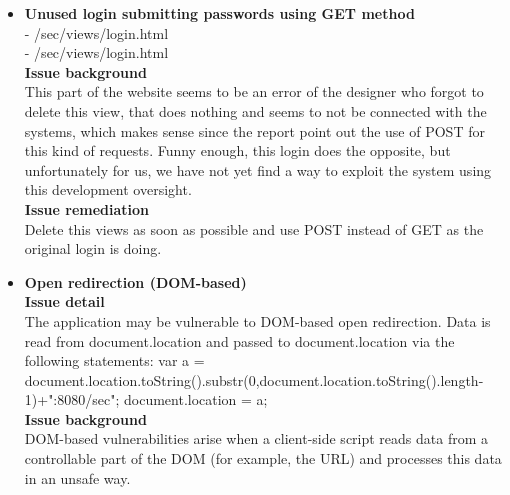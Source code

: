 \begin{itemize}
\textbf{Issue remediation} \\
A simple improvement could be the implementation of an anti-CSRF token in every request that performs actions which change the application state (create, update and delete requests)\footnote{ \url{www.owasp.org/index.php/CSRF_Prevention_Cheat_Sheet}}. A well defined anti-CSRF token should be long and randomly generated, to ensure uniqueness for each user so that attackers will have a very difficult time trying to  brute-force it. \\ 




\item \textbf{Unused login submitting passwords using GET method} \\
- /sec/views/login.html \\
- /sec/views/login.html \\

\textbf{Issue background}\\
This part of the website seems to be an error of the designer who forgot to delete this view, that does nothing and seems to not be connected with the systems, which makes sense since the report point out the use of POST for this kind of requests. Funny enough, this login does the opposite, but unfortunately for us, we have not yet find a way to exploit the system using this development oversight. \\


\textbf{Issue remediation}\\
Delete this views as soon as possible and use POST instead of GET as the original login is doing.

\item \textbf{Open redirection (DOM-based)} \\

\textbf{Issue detail} \\
The application may be vulnerable to DOM-based open redirection. Data is read from document.location and passed to document.location via the following statements:
var a = document.location.toString().substr(0,document.location.toString().length-1)+":8080/sec";
document.location = a; \\

\textbf{Issue background} \\
DOM-based vulnerabilities arise when a client-side script reads data from a controllable part of the DOM (for example, the URL) and processes this data in an unsafe way. \\


\end{itemize}
